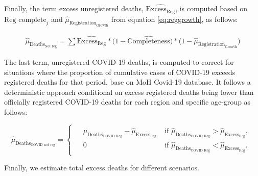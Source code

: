 \documentclass[
]{article}
\begin{document}
Finally, the term excess unregistered deaths, \(\widehat{{\text{Excess}}_\text{Reg}}\), is computed based on \(\text{Reg complete}_{j}\) and \(\widehat{\mu}_{\text{Registration}_\text{Growth}}\) from equation \eqref{eq:reggrowth}, as follows:

\begin{equation}
\label{eq:unreg}
  \begin{aligned}
  \widehat{\mu}_{\text{Deaths}_\text{Not reg}}=\sum{\widehat{{\text{Excess}}_\text{Reg}}} * \big(1-\widehat{\text{Completeness}}\big) * \big(1-\widehat{\mu}_{\text{Registration}_\text{Growth}}\big)
   \end{aligned}      
\end{equation}

The last term, unregistered COVID-19 deaths, is computed to correct for situations where the proportion of cumulative cases of COVID-19 exceeds registered deaths for that period, base on MoH Covid-19 database. It follows a deterministic approach conditional on excess registered deaths being lower than officially registered COVID-19 deaths for each region and specific age-group as follows:

\begin{equation}
\label{eq:covidnotreg}
   \widehat{\mu}_{\text{Deaths}_\text{COVID not reg}}=  
   \begin{cases}
    \begin{aligned}
 &  \widehat{\mu}_{\text{Deaths}_\text{COVID Reg}}-\widehat{\mu}_{\text{Excess}_\text{Reg}} \; & \text{if }\widehat{\mu}_{\text{Deaths}_\text{COVID Reg}} > \widehat{\mu}_{\text{Excess}_\text{Reg}},\\[1ex]
& 0 \;& \text{if }\widehat{\mu}_{\text{Deaths}_\text{COVID Reg}} < \widehat{\mu}_{\text{Excess}_\text{Reg}}.
  \end{aligned}
    \end{cases} 
\end{equation}

Finally, we estimate total excess deaths for different scenarios.
\end{document}
